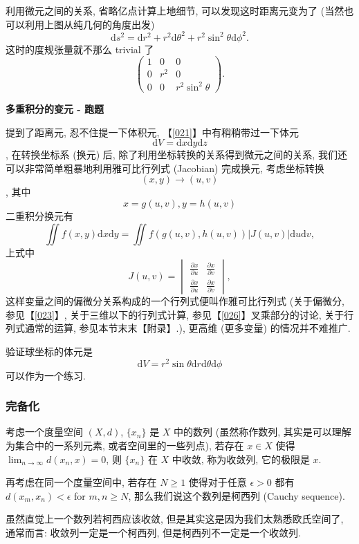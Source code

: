 \begin{newquote}
利用微元之间的关系, 省略亿点计算上地细节, 可以发现这时距离元变为了
(当然也可以利用上图从纯几何的角度出发) \[
\mathrm{d}s^2=\mathrm{d}r^2+r^2\mathrm{d}\theta^2+r^2\sin^2\theta\mathrm{d}\phi^2.
\] 这时的度规张量就不那么 trivial 了 \[
\begin{pmatrix}1&0&0\\0&r^2&0\\0&0&r^2\sin^2\theta\end{pmatrix}.
\]


\textbf{多重积分的变元 - 跑题}

提到了距离元, 忍不住提一下体积元, 【\ref{021}】中有稍稍带过一下体元
\[\mathrm{d}V=\mathrm{d}x\mathrm{d}y\mathrm{d}z\], 在转换坐标系 (换元)
后, 除了利用坐标转换的关系得到微元之间的关系,
我们还可以非常简单粗暴地利用雅可比行列式 (Jacobian) 完成换元,
考虑坐标转换 \[(x,y)\rightarrow(u,v)\], 其中 \[x=g(u,v), y=h(u,v)\]
二重积分换元有 \[
\iint f(x,y)\mathrm{d}x\mathrm{d}y=\iint f(g(u,v),h(u,v))|J(u,v)|\mathrm{d}u\mathrm{d}v,
\] 上式中 \[
J(u,v)=\begin{vmatrix}\frac{\partial x}{\partial u}&\frac{\partial x}{\partial v}\\\frac{\partial x}{\partial u}&\frac{\partial x}{\partial v}\end{vmatrix},
\] 这样变量之间的偏微分关系构成的一个行列式便叫作雅可比行列式
(关于偏微分, 参见【\ref{023}】, 关于三维以下的行列式计算,
参见【\ref{026}】叉乘部分的讨论, 关于行列式通常的运算, 参见本节末末【附录】.),
更高维 (更多变量) 的情况并不难推广.

验证球坐标的体元是
\[\mathrm{d}V=r^2\sin\theta\mathrm{d}r\mathrm{d}\theta\mathrm{d}\phi\]
可以作为一个练习.

\end{newquote}

\subsubsection{完备化}

考虑一个度量空间 \((X,d)\), \(\{x_n\}\) 是 \(X\) 中的数列 (虽然称作数列,
其实是可以理解为集合中的一系列元素, 或者空间里的一些列点), 若存在
\(x\in X\) 使得 \(\lim_{n\rightarrow\infty}d(x_n,x)=0\), 则 \(\{x_n\}\)
在 \(X\) 中收敛, 称为收敛列, 它的极限是 \(x\).

再考虑在同一个度量空间中, 若存在 \(N\ge1\) 使得对于任意 \(\epsilon>0\)
都有 \(d(x_m,x_n)<\epsilon\) for \(m,n\ge N\),
那么我们说这个数列是柯西列 (Cauchy sequence).

虽然直觉上一个数列若柯西应该收敛, 但是其实这是因为我们太熟悉欧氏空间了,
通常而言: 收敛列一定是一个柯西列, 但是柯西列不一定是一个收敛列.

